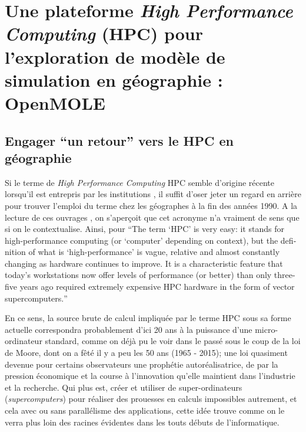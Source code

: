 
\newcommand\litem[1]{\item{\bfseries #1,\enspace}}

\section{Une plateforme \textit{High Performance Computing} (HPC) pour l'exploration de modèle de simulation en géographie : OpenMOLE}
\label{sec:retourgeoHPCopenmole}

\subsection{Engager \enquote{un retour} vers le HPC en géographie}
\label{ssec:retourHPC}

Si le terme de \textit{High Performance Computing} HPC semble d'origine récente lorsqu'il est entrepris par les institutions \autocite{HPCHorizon2020}, il suffit d'oser jeter un regard en arrière pour trouver l'emploi du terme chez les géographes à la fin des années 1990. A la lecture de ces ouvrages \autocites{Turton1998, Openshaw2000, Openshaw2000b}, on s'aperçoit que cet acronyme n'a vraiment de sens que si on le contextualise. Ainsi, pour \textcite{Openshaw2000} \foreignquote{english}{The term \enquote{HPC} is very easy: it stands for high-performance computing (or \enquote{computer} depending on context), but the definition of what is \enquote{high-performance} is vague, relative and almost constantly changing as hardware continues to improve. It is a characteristic feature that today's workstations now offer levels of performance (or better) than only three-five years ago required extremely expensive HPC hardware in the form of vector supercomputers.}

En ce sens, la source brute de calcul impliquée par le terme HPC sous sa forme actuelle correspondra probablement d'ici 20 ans à la puissance d'une micro-ordinateur standard, comme on déjà pu le voir dans le passé sous le coup de la loi de Moore, dont on a fêté il y a peu les 50 ans (1965 - 2015); une loi quasiment devenue pour certains observateurs une prophétie autoréalisatrice, de par la pression économique et la course à l'innovation qu'elle maintient dans l'industrie et la recherche. Qui plus est, créer et utiliser de super-ordinateurs (\textit{supercomputers}) pour réaliser des prouesses en calculs impossibles autrement, et cela avec ou sans parallélisme des applications, cette idée trouve comme on le verra plus loin des racines évidentes dans les touts débuts de l'informatique.

